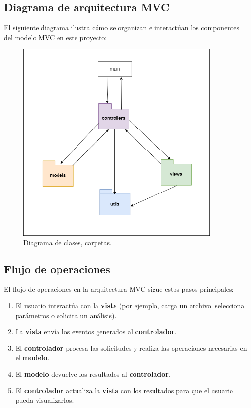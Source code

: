 \subsection{Diagrama de arquitectura MVC}

El siguiente diagrama ilustra cómo se organizan e interactúan los componentes del modelo MVC en este proyecto:

\begin{figure}[H]
    \centering
    \includegraphics[width=0.9\textwidth]{img/vistacontrolador.png}
    \caption{Diagrama de clases, carpetas.}
\end{figure}


\subsection{Flujo de operaciones}

El flujo de operaciones en la arquitectura MVC sigue estos pasos principales:

\begin{enumerate}
    \item El usuario interactúa con la \textbf{vista} (por ejemplo, carga un archivo, selecciona parámetros o solicita un análisis).
    \item La \textbf{vista} envía los eventos generados al \textbf{controlador}.
    \item El \textbf{controlador} procesa las solicitudes y realiza las operaciones necesarias en el \textbf{modelo}.
    \item El \textbf{modelo} devuelve los resultados al \textbf{controlador}.
    \item El \textbf{controlador} actualiza la \textbf{vista} con los resultados para que el usuario pueda visualizarlos.
\end{enumerate}

